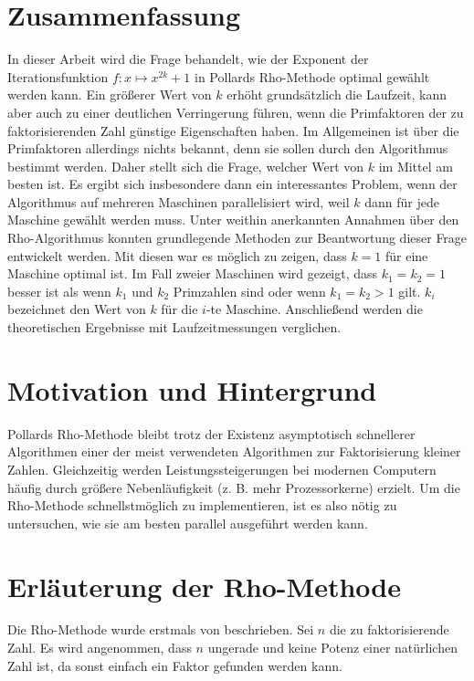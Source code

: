 \documentclass[a4paper, 11pt, ngerman]{article}
\theoremstyle{definition}
\theoremstyle{plain}
\theoremstyle{remark}
\begin{document}
\newpage

\section{Zusammenfassung}

In dieser Arbeit wird die Frage behandelt, wie der Exponent der Iterationsfunktion $f : x \mapsto x^{2k} + 1$ in Pollards Rho-Methode optimal gewählt werden kann. Ein größerer Wert von $k$ erhöht grundsätzlich die Laufzeit, kann aber auch zu einer deutlichen Verringerung führen, wenn die Primfaktoren der zu faktorisierenden Zahl günstige Eigenschaften haben. Im Allgemeinen ist über die Primfaktoren allerdings nichts bekannt, denn sie sollen durch den Algorithmus bestimmt werden. Daher stellt sich die Frage, welcher Wert von $k$ im Mittel am besten ist. Es ergibt sich insbesondere dann ein interessantes Problem, wenn der Algorithmus auf mehreren Maschinen parallelisiert wird, weil $k$ dann für jede Maschine gewählt werden muss. Unter weithin anerkannten Annahmen über den Rho-Algorithmus konnten grundlegende Methoden zur Beantwortung dieser Frage entwickelt werden. Mit diesen war es möglich zu zeigen, dass $k = 1$ für eine Maschine optimal ist. Im Fall zweier Maschinen wird gezeigt, dass $k_1 = k_2 = 1$ besser ist als wenn $k_1$ und $k_2$ Primzahlen sind oder wenn $k_1 = k_2 > 1$ gilt. $k_i$ bezeichnet den Wert von $k$ für die $i$-te Maschine. Anschließend werden die theoretischen Ergebnisse mit Laufzeitmessungen verglichen.

\section{Motivation und Hintergrund}

Pollards Rho-Methode bleibt trotz der Existenz asymptotisch schnellerer Algorithmen einer der meist verwendeten Algorithmen zur Faktorisierung kleiner Zahlen. Gleichzeitig werden Leistungssteigerungen bei modernen Computern häufig durch größere Nebenläufigkeit (z. B. mehr Prozessorkerne) erzielt. Um die Rho-Methode schnellstmöglich zu implementieren, ist es also nötig zu untersuchen, wie sie am besten parallel ausgeführt werden kann.

\section{Erläuterung der Rho-Methode}
\label{sec:pollards-rho-method}

Die Rho-Methode wurde erstmals von \cite{pol75} beschrieben. Sei $n$ die zu faktorisierende Zahl. Es wird angenommen, dass $n$ ungerade und keine Potenz einer natürlichen Zahl ist, da sonst einfach ein Faktor gefunden werden kann.
\end{document}
